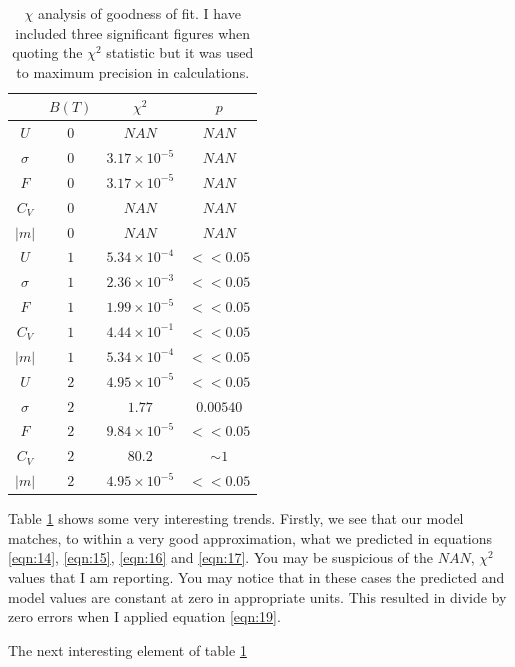 \documentclass[a4paper, twocolumn]{article}
\begin{document}
\begin{table}
    \centering
    \begin{tabular}{|c|c|c|c|}
        \hline
        & \(B (T)\) & \(\chi^{2}\) & \(p\) \\
        \hline
        \hline
        \(U\)      & \(0\) & \(NAN\)                 & \(NAN\) \\ 
        \(\sigma\) & \(0\) & \(3.17 \times 10^{-5}\) & \(NAN\) \\
        \(F\)      & \(0\) & \(3.17 \times 10^{-5}\) & \(NAN\) \\
        \(C_{V}\)  & \(0\) & \(NAN\)                 & \(NAN\) \\
        \(|m|\)    & \(0\) & \(NAN\)                 & \(NAN\) \\
        \hline
        \(U\)      & \(1\) & \(5.34 \times 10^{-4}\) & \(<< 0.05\) \\ 
        \(\sigma\) & \(1\) & \(2.36 \times 10^{-3}\) & \(<< 0.05\) \\
        \(F\)      & \(1\) & \(1.99 \times 10^{-5}\) & \(<< 0.05\) \\
        \(C_{V}\)  & \(1\) & \(4.44 \times 10^{-1}\) & \(<< 0.05\) \\
        \(|m|\)    & \(1\) & \(5.34 \times 10^{-4}\) & \(<< 0.05\) \\
        \hline
        \(U\)      & \(2\) & \(4.95 \times 10^{-5}\) & \(<< 0.05\) \\ 
        \(\sigma\) & \(2\) & \(1.77\)                & \(0.00540\) \\
        \(F\)      & \(2\) & \(9.84 \times 10^{-5}\) & \(<< 0.05\) \\
        \(C_{V}\)  & \(2\) & \(80.2\)                & \(\sim 1\)  \\
        \(|m|\)    & \(2\) & \(4.95 \times 10^{-5}\) & \(<< 0.05\) \\
        \hline
    \end{tabular}
    \caption{\(\chi\) analysis of goodness of fit. I have included %
        three significant figures when quoting the \(\chi^{2}\) %
        statistic but it was used to maximum precision in calculations.}
    \label{tab:1}
\end{table}


Table \ref{tab:1} shows some very interesting trends. Firstly, we see %
that our model matches, to within a very good approximation, what we %
predicted in equations \ref{eqn:14}, \ref{eqn:15}, \ref{eqn:16} and %
\ref{eqn:17}. You may be suspicious of the \(NAN\), \(\chi^{2}\) values %
that I am reporting. You may notice that in these cases the predicted %
and model values are constant at zero in appropriate units. This %
resulted in divide by zero errors when I applied equation \ref{eqn:19}.


The next interesting element of table \ref{tab:1}
\end{document}
